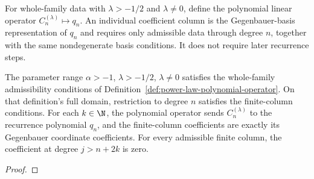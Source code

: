 \begin{supporting}
\begin{definition}
\label{def:power-law-polynomial-operator}
\leanok
For whole-family data with $\lambda>-1/2$ and $\lambda\ne0$, define the
polynomial linear operator $C_n^{(\lambda)}\mapsto q_n$.
An individual coefficient column is the Gegenbauer-basis representation of
$q_n$ and requires only admissible data through degree $n$, together with the
same nondegenerate basis conditions. It does not require later recurrence steps.
\end{definition}
\begin{theorem}
\label{thm:power-law-polynomial-operator}
\leanok
The parameter range $\alpha>-1$, $\lambda>-1/2$, $\lambda\ne0$ satisfies
the whole-family admissibility conditions of
Definition~\ref{def:power-law-polynomial-operator}.
On that definition's full domain, restriction to degree $n$ satisfies the
finite-column conditions. For each $k\in\N$, the polynomial operator sends
$C_n^{(\lambda)}$ to the recurrence polynomial $q_n$, and the finite-column
coefficients are exactly its Gegenbauer coordinate coefficients.
For every admissible finite column, the coefficient at degree $j>n+2k$ is zero.
\end{theorem}
\begin{proof}
\leanok
\end{proof}
\end{supporting}


